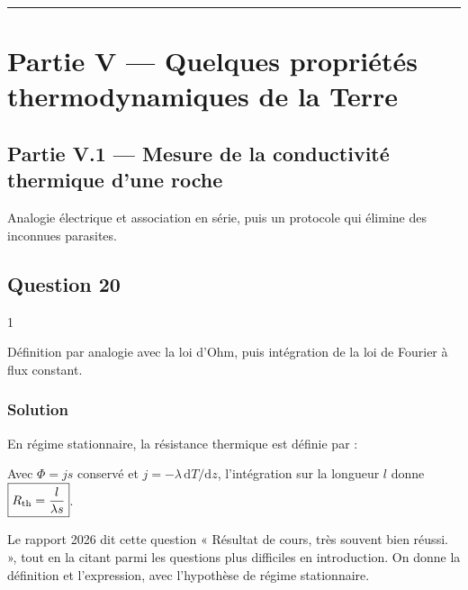 \documentclass[11pt,a4paper]{article}
\newcommand{\equationajustee}[1]{%
  \sbox{\boiteequation}{$\displaystyle #1$}%
  \ifdim\wd\boiteequation>\linewidth
    \[\resizebox{\linewidth}{!}{\usebox{\boiteequation}}\]%
  \else
    \[#1\]%
  \fi}
\begin{document}
\begin{center}\rule{0.5\linewidth}{0.5pt}\end{center}

\hypertarget{partie-v-quelques-propriuxe9tuxe9s-thermodynamiques-de-la-terre}{%
\section{Partie V --- Quelques propriétés thermodynamiques de la Terre}\label{partie-v-quelques-propriuxe9tuxe9s-thermodynamiques-de-la-terre}}

\hypertarget{partie-v.1-mesure-de-la-conductivituxe9-thermique-dune-roche}{%
\subsection{Partie V.1 --- Mesure de la conductivité thermique d'une roche}\label{partie-v.1-mesure-de-la-conductivituxe9-thermique-dune-roche}}

Analogie électrique et association en série, puis un protocole qui élimine des inconnues parasites.

\hypertarget{question-20}{%
\subsection{Question 20}\label{question-20}}

\begin{indication}{1}

Définition par analogie avec la loi d'Ohm, puis intégration de la loi de Fourier à flux constant.

\end{indication}

\hypertarget{solution-19}{%
\subsubsection{Solution}\label{solution-19}}

En régime stationnaire, la résistance thermique est définie par :

\equationajustee{R_{\rm th}=\frac{T_e-T_s}{\Phi}}

Avec \(\Phi=js\) conservé et \(j=-\lambda\,\mathrm dT/\mathrm dz\), l'intégration sur la longueur \(l\) donne \(\boxed{R_{\rm th}=\dfrac{l}{\lambda s}}\).

\begin{jury}

Le rapport 2026 dit cette question « Résultat de cours, très souvent bien réussi. », tout en la citant parmi les questions plus difficiles en introduction. On donne la définition et l'expression, avec l'hypothèse de régime stationnaire.

\end{jury}
\end{document}
